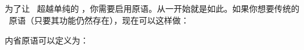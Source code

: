 \subsection{\label{sec:pdfextensions}}

为了让 \LUATEX\ 超越单纯的 \TEX，你需要启用原语。从一开始就是如此。如果你想要传统的 \PDFTEX\ 原语（只要其功能仍然存在），现在可以这样做：

\begin{typing}
\def\pdfliteral             {\pdfextension literal}
\def\pdflateliteral         {\pdfextension lateliteral}
\def\pdfcolorstack          {\pdfextension colorstack}
\def\pdfsetmatrix           {\pdfextension setmatrix}
\def\pdfsave                {\pdfextension save\relax}
\def\pdfrestore             {\pdfextension restore\relax}
\def\pdfobj                 {\pdfextension obj }
\def\pdfrefobj              {\pdfextension refobj }
\def\pdfannot               {\pdfextension annot }
\def\pdfstartlink           {\pdfextension startlink }
\def\pdfendlink             {\pdfextension endlink\relax}
\def\pdfoutline             {\pdfextension outline }
\def\pdfdest                {\pdfextension dest }
\def\pdfthread              {\pdfextension thread }
\def\pdfstartthread         {\pdfextension startthread }
\def\pdfendthread           {\pdfextension endthread\relax}
\def\pdfinfo                {\pdfextension info }
\def\pdfcatalog             {\pdfextension catalog }
\def\pdfnames               {\pdfextension names }
\def\pdfincludechars        {\pdfextension includechars }
\def\pdffontattr            {\pdfextension fontattr }
\def\pdfmapfile             {\pdfextension mapfile }
\def\pdfmapline             {\pdfextension mapline }
\def\pdftrailer             {\pdfextension trailer }
\def\pdfglyphtounicode      {\pdfextension glyphtounicode }
\def\pdfrunninglinkoff      {\pdfextension linkstate 1 }
\def\pdfrunninglinkon       {\pdfextension linkstate 0 }
\end{typing}

内省原语可以定义为：

\begin{typing}
\def\pdftexversion    {\numexpr\pdffeedback version\relax}
\def\pdflastlink      {\numexpr\pdffeedback lastlink\relax}
\def\pdfretval        {\numexpr\pdffeedback retval\relax}
\def\pdflastobj       {\numexpr\pdffeedback lastobj\relax}
\def\pdflastannot     {\numexpr\pdffeedback lastannot\relax}
\def\pdfxformname     {\numexpr\pdffeedback xformname\relax}
\def\pdfcreationdate          {\pdffeedback creationdate}
\def\pdffontname      {\numexpr\pdffeedback fontname\relax}
\def\pdffontobjnum    {\numexpr\pdffeedback fontobjnum\relax}
\def\pdffontsize      {\dimexpr\pdffeedback fontsize\relax}
\def\pdfpageref       {\numexpr\pdffeedback pageref\relax}
\def\pdfcolorstackinit        {\pdffeedback colorstackinit}
\end{typing}

